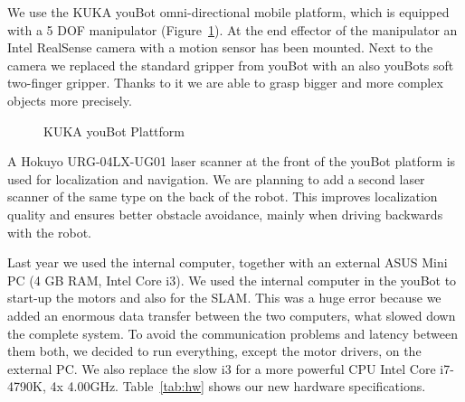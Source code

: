 We use the KUKA youBot omni-directional mobile platform, which is equipped with a 5 DOF manipulator (Figure~\ref{fig:youBot}). At the end effector of the manipulator an Intel RealSense camera with a motion sensor has been mounted. Next to the camera we replaced the standard gripper from youBot with an also youBots soft two-finger gripper. Thanks to it we are able to grasp bigger and more complex objects more precisely.

\begin{figure}[htbp]
	\centering
	\caption{KUKA youBot Plattform}
	\label{fig:youBot}
\end{figure}

A Hokuyo URG-04LX-UG01 laser scanner at the front of the youBot platform is used for localization and navigation. We are planning to add a second laser scanner of the same type on the back of the robot. This improves localization quality and ensures better obstacle avoidance, mainly when driving backwards with the robot.

Last year we used the internal computer, together with an external ASUS Mini PC (4 GB RAM, Intel Core i3). We used the internal computer in the youBot to start-up the motors and also for the SLAM. This was a huge error because we added an enormous data transfer between the two computers, what slowed down the complete system. To avoid the communication problems and latency between them both, we decided to run everything, except the motor drivers, on the external PC. We also replace the slow i3 for a more powerful CPU Intel Core i7-4790K, 4x 4.00GHz. Table~\ref{tab:hw} shows our new hardware specifications. 

